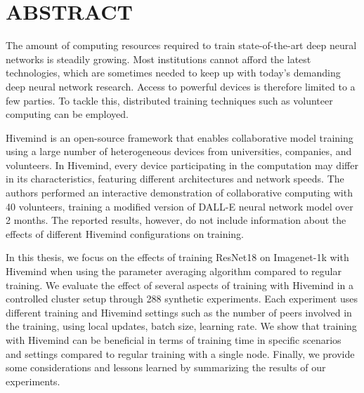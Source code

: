 \chapter{ABSTRACT}

The amount of computing resources required to train state-of-the-art deep neural networks is steadily growing.
Most institutions cannot afford the latest technologies, which are sometimes needed to keep up with today's demanding deep neural network research.
Access to powerful devices is therefore limited to a few parties.
To tackle this, distributed training techniques such as volunteer computing can be employed.

Hivemind \cite{hivemind} is an open-source framework that enables collaborative model training using a large number of heterogeneous devices from universities, companies, and volunteers.
In Hivemind, every device participating in the computation may differ in its characteristics, featuring different architectures and network speeds.
The authors performed an interactive demonstration of collaborative computing with 40 volunteers, training a modified version of DALL-E \cite{ramesh2021zero} neural network model over 2 months.
The reported results, however, do not include information about the effects of different Hivemind configurations on training.

In this thesis, we focus on the effects of training ResNet18 \cite{he2015deep} on Imagenet-1k \cite{deng2009imagenet} with Hivemind when using the parameter averaging algorithm \cite{DBLP:journals/corr/abs-2106-10207} compared to regular training.
We evaluate the effect of several aspects of training with Hivemind in a controlled cluster setup through 288 synthetic experiments.
Each experiment uses different training and Hivemind settings such as the number of peers involved in the training, using local updates, batch size, learning rate.
We show that training with Hivemind can be beneficial in terms of training time in specific scenarios and settings compared to regular training with a single node.
Finally, we provide some considerations and lessons learned by summarizing the results of our experiments.
